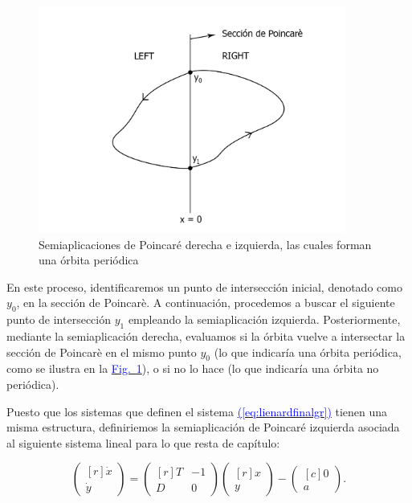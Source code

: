 \documentclass[12pt,a4paper]{report} %
\newcommand{\fref}[1]{\hyperref[#1]{\textcolor{blue}{Fig.~\ref*{#1}}}}
\newcommand{\eref}[1]{\hyperref[#1]{\textcolor{blue}{(\ref*{#1})}}}
\begin{document}
	\begin{figure}[h]
		\centering
		\includegraphics[width=0.9\textwidth]{poincaLR.jpg}
		\caption{Semiaplicaciones de Poincaré derecha e izquierda, las cuales forman una órbita periódica}
		\label{fig:poincaLR}
	\end{figure}\smallskip
	
	En este proceso, identificaremos un punto de intersección inicial, denotado como $y_0$, en la sección de Poincarè. A continuación, procedemos a buscar el siguiente punto de intersección $y_1$ empleando la semiaplicación izquierda. Posteriormente, mediante la semiaplicación derecha, evaluamos si la órbita vuelve a intersectar la sección de Poincarè en el mismo punto $y_0$ (lo que indicaría una órbita periódica, como se ilustra en la \fref{fig:poincaLR}), o si no lo hace (lo que indicaría una órbita no periódica).
	
	\vspace{0.5cm} Puesto que los sistemas que definen el sistema \eref{eq:lienardfinalgr} tienen una misma estructura, definiriemos la semiaplicación de Poincaré izquierda asociada al siguiente sistema lineal para lo que resta de capítulo:
	
		\begin{equation}
		\label{eq:lienardsolo}
		\begin{pmatrix*}[r]
			\dot{x}\\ \dot{y}
		\end{pmatrix*}= \begin{pmatrix*}[r]
			T & -1 \\ D & 0
		\end{pmatrix*} \begin{pmatrix*}[r]
			x \\ y
		\end{pmatrix*}-\begin{pmatrix*}[c]
			0 \\ a
		\end{pmatrix*}.
	\end{equation}\smallskip
	
\end{document}
